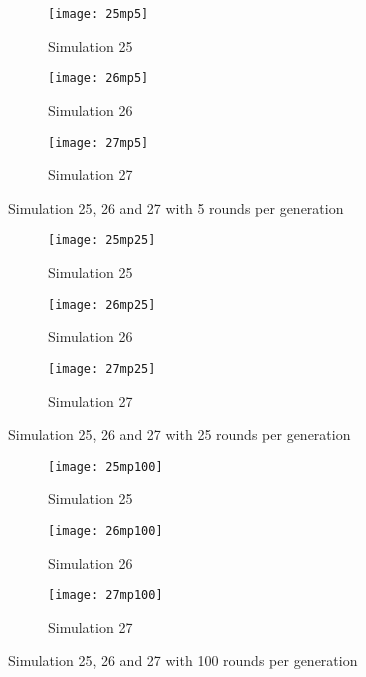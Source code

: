 \begin{figure}[H]       
    \centering
    \begin{subfigure}[b]{0.3\textwidth}
	\centering
	{\texttt{[image: 25mp5]}}   
    	\caption{Simulation 25}
	\label{fig:mpsim255}
    \end{subfigure}
    \hfill
    \begin{subfigure}[b]{0.3\textwidth}
	\centering
	{\texttt{[image: 26mp5]}}   
    	\caption{Simulation 26}
	\label{fig:mpsim265}
    \end{subfigure}
    \hfill
    \begin{subfigure}[b]{0.3\textwidth}
	\centering
	{\texttt{[image: 27mp5]}}   
    	\caption{Simulation 27}
	\label{fig:mpsim275}
    \end{subfigure}
    \caption{Simulation 25, 26 and 27 with 5 rounds per generation}
    \label{mpsim252627simulations5}
\end{figure}

\begin{figure}[H]       
    \centering
    \begin{subfigure}[b]{0.3\textwidth}
	\centering
	{\texttt{[image: 25mp25]}}   
    	\caption{Simulation 25}
	\label{fig:mpsim2525}
    \end{subfigure}
    \hfill
    \begin{subfigure}[b]{0.3\textwidth}
	\centering
	{\texttt{[image: 26mp25]}}   
    	\caption{Simulation 26}
	\label{fig:mpsim2625}
    \end{subfigure}
    \hfill
    \begin{subfigure}[b]{0.3\textwidth}
	\centering
	{\texttt{[image: 27mp25]}}   
    	\caption{Simulation 27}
	\label{fig:mpsim2725}
    \end{subfigure}
    \caption{Simulation 25, 26 and 27 with 25 rounds per generation}
    \label{mpsim252627simulations25}
\end{figure}

\begin{figure}[H]       
    \centering
    \begin{subfigure}[b]{0.3\textwidth}
	\centering
	{\texttt{[image: 25mp100]}}   
    	\caption{Simulation 25}
	\label{fig:mpsim25100}
    \end{subfigure}
    \hfill
    \begin{subfigure}[b]{0.3\textwidth}
	\centering
	{\texttt{[image: 26mp100]}}   
    	\caption{Simulation 26}
	\label{fig:mpsim26100}
    \end{subfigure}
    \hfill
    \begin{subfigure}[b]{0.3\textwidth}
	\centering
	{\texttt{[image: 27mp100]}}   
    	\caption{Simulation 27}
	\label{fig:mpsim27100}
    \end{subfigure}
    \caption{Simulation 25, 26 and 27 with 100 rounds per generation}
    \label{mpsim252627simulations100}
\end{figure}

